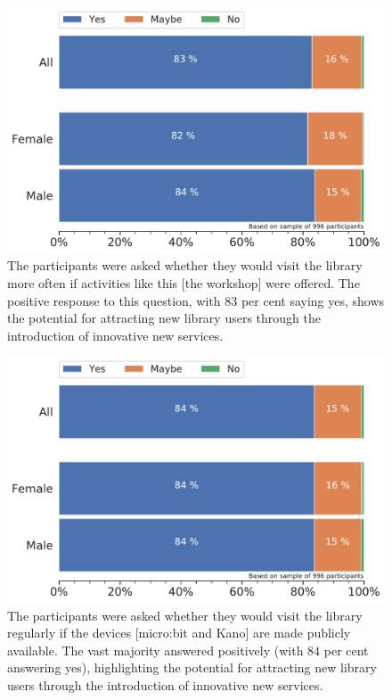 \documentclass[12pt]{report} %
\begin{document}
\begin{figure}[t!]
    \centering
        \includegraphics[width=1\textwidth]{bar_libraryvisitactivities}
\caption{The participants were asked whether they would visit the library more often if activities like this [the workshop] were offered. The positive response to this question, with 83 per cent saying yes, shows the potential for attracting new library users through the introduction of innovative new services.  } 
\label{fig:libraryvisitactivities}
\end{figure}

\begin{figure}[t!]
    \centering
        \includegraphics[width=1\textwidth]{bar_libraryvisitdevices}
\caption{The participants were asked whether they would visit the library regularly if the devices [micro:bit and Kano] are made publicly available. The vast majority answered positively (with $84$ per cent answering yes), highlighting the potential for attracting new library users through the introduction of innovative new services.} 
\label{fig:libraryvisitdevices}
\end{figure}
\end{document}
